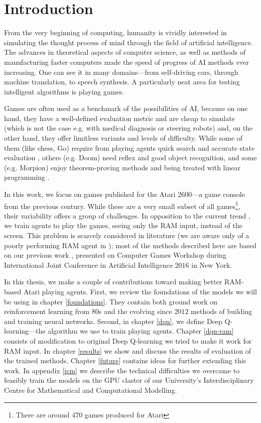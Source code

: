 \chapter*{Introduction}
From the very beginning of computing, humanity is vividly interested in simulating the thought process of mind through the field of artificial intelligence. The advances in theoretical aspects of computer science, as well as methods of manufacturing faster computers made the speed of progress of AI methods ever increasing. One can see it in many domains---from self-driving cars, through machine translation, to speech synthesis. A particularly neat area for testing intelligent algorithms is playing games.

Games are often used as a benchmark of the possibilities of AI, because on one hand, they have a well-defined evaluation metric and are cheap to simulate (which is not the case e.g. with medical diagnosis or steering robots) and, on the other hand, they offer limitless variants and levels of difficulty. While some of them (like chess, Go) require from playing agents quick search and accurate state evaluation \cite{alphago}, others (e.g. Doom) need reflex and good object recognition, and some (e.g. Morpion) enjoy theorem-proving methods and being treated with linear programming \cite{morpion}.


In this work, we focus on games published for the Atari 2600---a game console from the previous century. While these are a very small subset of all games\footnote{There are around 470 games produced for Atari}, their variability offers a group of challenges. In opposition to the current trend \cite{nips-dqn, nature-dqn, a3c}, we train agents to play the games, seeing only the RAM input, instead of the screen. This problem is scarcely considered in literature (we are aware only of a poorly performing RAM agent in \cite{ale}); most of the methods described here are based on our previous work \cite{our-paper}, presented on Computer Games Workshop during International Joint Conference in Artificial Intelligence $2016$ in New York.

In this thesis, we make a couple of contributions toward making better RAM-based Atari playing agents. First, we review the foundations of the models we will be using in chapter \ref{foundations}. They contain both ground work on reinforcement learning from 80s and the evolving since $2012$ methods of building and training neural networks.
Second, in chapter \ref{dqn}, we define Deep Q-learning---the algorithm we use to train playing agents.
Chapter \ref{dqn-ram} consists of modification to original Deep Q-learning we tried to make it work for RAM input.
In chapter \ref{results} we show and discuss the results of evaluation of the trained methods.
Chapter \ref{future} contains ideas for further extending this work.
In appendix \ref{icm} we describe the technical difficulties we overcame to feasibly train the models on the GPU claster of our University's Interdisciplinary Centre for Mathematical and Computational Modelling.
\iffalse
\section*{Acknowledgements}
\addcontentsline{toc}{section}{Acknowledgements}
First of all, I would like to thank dr hab. Henryk Michalewski 
\todo{Acknolegments to Marc, Henryk, ICM \& Deepsense.io}
\fi
